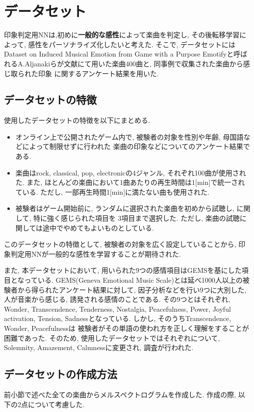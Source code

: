 \documentclass[a4paper,11pt,dvipdfmx]{jreport}
\begin{document}
\section{データセット}
印象判定用NNは,初めに\textbf{一般的な感性}によって楽曲を判定し, その後転移学習によって, 感性をパーソナライズ化したいと考えた.
そこで, データセットにはDataset on Induced Musical Emotion from Game with a Purpose Emotifyと呼ばれるA.Aljanakiらが文献\cite{game}にて用いた楽曲400曲と, 同事例で収集された楽曲から感じ取られた印象
に関するアンケート結果を用いた.
\subsection{データセットの特徴}
使用したデータセットの特徴を以下にまとめる.
\begin{itemize}
  \item オンライン上で公開されたゲーム内で, 被験者の対象を性別や年齢, 母国語などによって制限せずに行われた 
        楽曲の印象などについてのアンケート結果である.
  \item 楽曲はrock, classical, pop, electronicの4ジャンル, それぞれ100曲が使用された.
        また, ほとんどの楽曲において1曲あたりの再生時間は1[min]で統一されている. ただし, 一部再生時間1[min]に満たない曲も使用された.
  \item 被験者はゲーム開始前に, ランダムに選択された楽曲を初めから試聴し, に関して, 特に強く感じられた項目を
        3項目まで選択した. ただし, 楽曲の試聴に関しては途中でやめてもよいものとしている.
\end{itemize}

このデータセットの特徴として, 被験者の対象を広く設定していることから, 印象判定用NNが一般的な感性を学習することが期待された.

また, 本データセットにおいて, 用いられた9つの感情項目はGEMSを基にした項目となっている.
GEMS(Geneva Emotional Music Scale)\cite{GEMS}とは延べ1000人以上の被験者から得られたアンケート結果に対して, 
因子分析などを行い9つに大別した, 人が音楽から感じる, 誘発される感情のことである.
その9つとはそれぞれ, Wonder, Transcendence, Tenderness, Nostalgia, Peacefulness, Power, 
Joyful activation, Tension, Sadnessとなっている. 
しかし, そのうちTranscendence, Wonder, Peacefulnessは
被験者がその単語の使われ方を正しく理解をすることが困難であった.
そのため, 使用したデータセットではそれぞれについて, Solemnity, Amazement, Calmnessに変更され, 調査が行われた.

\subsection{データセットの作成方法}
前小節で述べた全ての楽曲からメルスペクトログラムを作成した.
作成の際, 以下の2点について考慮した.
\end{document}
